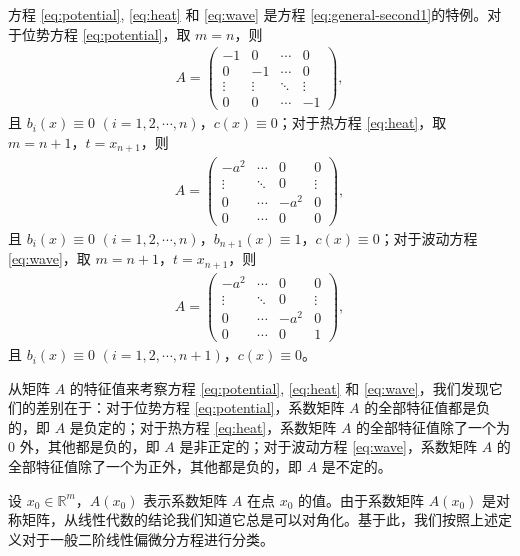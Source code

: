 \documentclass[../../main.tex]{subfiles}%
\begin{document}
\begin{remark}
方程 \eqref{eq:potential}, \eqref{eq:heat} 和 \eqref{eq:wave} 是方程 \eqref{eq:general-second1}的特例。对于位势方程 \eqref{eq:potential}，取 $m=n$，则
\begin{align*}
A = \begin{pmatrix}
-1 & 0 & \cdots & 0 \\
0 & -1 & \cdots & 0 \\
\vdots & \vdots & \ddots & \vdots \\
0 & 0 & \cdots & -1
\end{pmatrix},
\end{align*}
且 $b_i(x)\equiv 0$ $(i=1,2,\cdots,n)$，$c(x)\equiv 0$；对于热方程 \eqref{eq:heat}，取 $m=n+1$，$t=x_{n+1}$，则
\begin{align*}
A = \begin{pmatrix}
-a^2 & \cdots & 0 & 0 \\
\vdots & \ddots & 0 & \vdots \\
0 & \cdots & -a^2 & 0 \\
0 & \cdots & 0 & 0
\end{pmatrix},
\end{align*}
且 $b_i(x)\equiv 0$ $(i=1,2,\cdots,n)$，$b_{n+1}(x)\equiv 1$，$c(x)\equiv 0$；对于波动方程 \eqref{eq:wave}，取 $m=n+1$，$t=x_{n+1}$，则
\begin{align*}
A = \begin{pmatrix}
-a^2 & \cdots & 0 & 0 \\
\vdots & \ddots & 0 & \vdots \\
0 & \cdots & -a^2 & 0 \\
0 & \cdots & 0 & 1
\end{pmatrix},
\end{align*}
且 $b_i(x)\equiv 0$ $(i=1,2,\cdots,n+1)$，$c(x)\equiv 0$。

从矩阵 $A$ 的特征值来考察方程 \eqref{eq:potential}, \eqref{eq:heat} 和 \eqref{eq:wave}，我们发现它们的差别在于：对于位势方程 \eqref{eq:potential}，系数矩阵 $A$ 的全部特征值都是负的，即 $A$ 是负定的；对于热方程 \eqref{eq:heat}，系数矩阵 $A$ 的全部特征值除了一个为 $0$ 外，其他都是负的，即 $A$ 是非正定的；对于波动方程 \eqref{eq:wave}，系数矩阵 $A$ 的全部特征值除了一个为正外，其他都是负的，即 $A$ 是不定的。

设 $x_0\in\mathbb{R}^m$，$A(x_0)$ 表示系数矩阵 $A$ 在点 $x_0$ 的值。由于系数矩阵 $A(x_0)$ 是对称矩阵，从线性代数的结论我们知道它总是可以对角化。基于此，我们按照上述定义对于一般二阶线性偏微分方程进行分类。
\end{remark}
\end{document}
